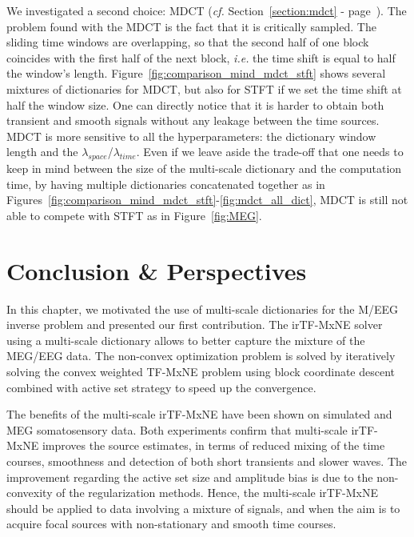 We investigated a second choice: \ac{MDCT} (\textit{cf.} Section~\ref{section:mdct} - page~\pageref{section:mdct}). The problem found with the MDCT is the fact that it is critically sampled. The sliding time windows are overlapping, so that the second half of one block coincides with the first half of the next block, \textit{i.e.} the time shift is equal to half the window's length. Figure~\ref{fig:comparison_mind_mdct_stft} shows several mixtures of dictionaries for MDCT, but also for STFT if we set the time shift at half the window size. One can directly notice that it is harder to obtain both transient and smooth signals without any leakage between the time sources. MDCT is more sensitive to all the hyperparameters: the dictionary window length and the $\lambda_{space}$/$\lambda_{time}$. Even if we leave aside the trade-off that one needs to keep in mind between the size of the multi-scale dictionary and the computation time, by having multiple dictionaries concatenated together as in Figures~\ref{fig:comparison_mind_mdct_stft}-\ref{fig:mdct_all_dict}, MDCT is still not able to compete with STFT as in Figure~\ref{fig:MEG}.

\section{Conclusion \& Perspectives}
In this chapter, we motivated the use of multi-scale dictionaries for the M/EEG inverse problem and presented our first contribution. The irTF-MxNE solver using a multi-scale dictionary allows to better capture the mixture of the MEG/EEG data. The non-convex optimization problem is solved by iteratively solving the convex weighted TF-MxNE problem using block coordinate descent combined with active set strategy to speed up the convergence.

The benefits of the multi-scale irTF-MxNE have been shown on simulated and MEG somatosensory data. Both experiments confirm that multi-scale irTF-MxNE improves the source estimates, in terms of reduced mixing of the time courses, smoothness and detection of both short transients and slower waves. The improvement regarding the active set size and amplitude bias is due to the non-convexity of the regularization methods. Hence, the multi-scale irTF-MxNE should be applied to data involving a mixture of signals, and when the aim is to acquire focal sources with non-stationary and smooth time courses.


